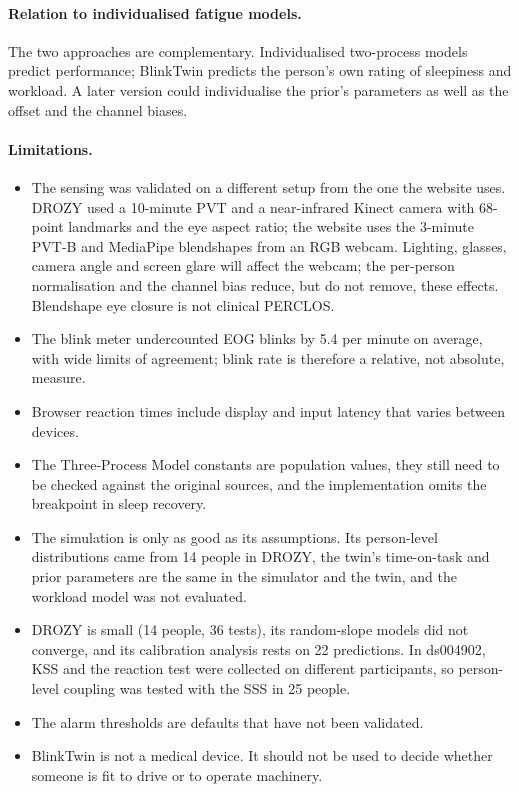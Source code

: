 \paragraph{Relation to individualised fatigue models.} The two approaches are complementary. Individualised two-process models predict performance; BlinkTwin predicts the person's own rating of sleepiness and workload. A later version could individualise the prior's parameters as well as the offset and the channel biases.

\paragraph{Limitations.}
\begin{itemize}[leftmargin=*,itemsep=2pt]
  \item The sensing was validated on a different setup from the one the website uses. DROZY used a 10-minute PVT and a near-infrared Kinect camera with 68-point landmarks and the eye aspect ratio; the website uses the 3-minute PVT-B and MediaPipe blendshapes from an RGB webcam. Lighting, glasses, camera angle and screen glare will affect the webcam; the per-person normalisation and the channel bias reduce, but do not remove, these effects. Blendshape eye closure is not clinical PERCLOS.
  \item The blink meter undercounted EOG blinks by 5.4 per minute on average, with wide limits of agreement; blink rate is therefore a relative, not absolute, measure.
  \item Browser reaction times include display and input latency that varies between devices.
  \item The Three-Process Model constants are population values, they still need to be checked against the original sources, and the implementation omits the breakpoint in sleep recovery.
  \item The simulation is only as good as its assumptions. Its person-level distributions came from 14 people in DROZY, the twin's time-on-task and prior parameters are the same in the simulator and the twin, and the workload model was not evaluated.
  \item DROZY is small (14 people, 36 tests), its random-slope models did not converge, and its calibration analysis rests on 22 predictions. In ds004902, KSS and the reaction test were collected on different participants, so person-level coupling was tested with the SSS in 25 people.
  \item The alarm thresholds are defaults that have not been validated.
  \item BlinkTwin is not a medical device. It should not be used to decide whether someone is fit to drive or to operate machinery.
\end{itemize}

